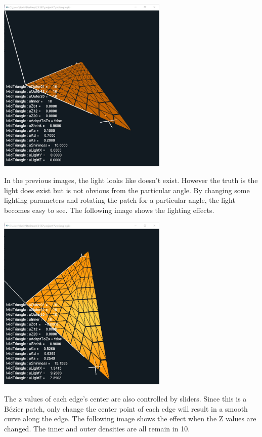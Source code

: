 \documentclass[letterpaper,14pt,titlepage,fleqn]{article}
\begin{document}
\begin{center}
	\includegraphics[width=3.2in]{inner.jpg}
\end{center}
In the previous images, the light looks like doesn't exist. However the truth is the light does exist but is not obvious from the particular angle. By changing some lighting parameters and rotating the patch for a particular angle, the light becomes easy to see. The following image shows the lighting effects.
\begin{center}
	\includegraphics[width=3.2in]{light.jpg}
\end{center}
The z values of each edge's center are also controlled by sliders. Since this is a B\'{e}zier patch, only change the center point of each edge will result in a smooth curve along the edge. The following image shows the effect when the Z values are changed. The inner and outer densities are all remain in 10.
\end{document}
